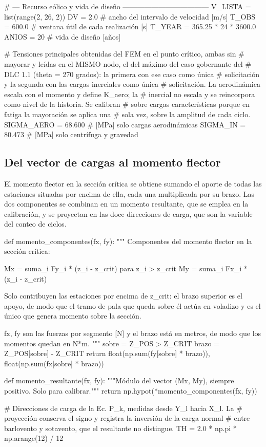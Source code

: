 \begin{pycode}
# --- Recurso eólico y vida de diseño ------------------------------------
V_LISTA   = list(range(2, 26, 2))
DV        = 2.0       # ancho del intervalo de velocidad [m/s]
T_OBS     = 600.0     # ventana útil de cada realización [s]
T_YEAR    = 365.25 * 24 * 3600.0
ANIOS     = 20        # vida de diseño [años]

# Tensiones principales obtenidas del FEM en el punto crítico, ambas sin
# mayorar y leídas en el MISMO nodo, el del máximo del caso gobernante del
# DLC 1.1 (theta = 270 grados): la primera con ese caso como única
# solicitación y la segunda con las cargas inerciales como única
# solicitación. La aerodinámica escala con el momento y define K_aero; la
# inercial no escala y se reincorpora como nivel de la historia. Se calibran
# sobre cargas características porque en fatiga la mayoración se aplica una
# sola vez, sobre la amplitud de cada ciclo.
SIGMA_AERO = 68.600   # [MPa] solo cargas aerodinámicas
SIGMA_IN   = 80.473   # [MPa] solo centrífuga y gravedad
\end{pycode}

\subsection*{Del vector de cargas al momento flector}

El momento flector en la sección crítica se obtiene sumando el aporte de todas las estaciones situadas por encima de ella, cada una multiplicada por su brazo. Las dos componentes se combinan en un momento resultante, que se emplea en la calibración, y se proyectan en las doce direcciones de carga, que son la variable del conteo de ciclos.

\begin{pycode}
def momento_componentes(fx, fy):
    """
    Componentes del momento flector en la sección crítica:

        Mx = suma_i Fy_i * (z_i - z_crit)      para z_i > z_crit
        My = suma_i Fx_i * (z_i - z_crit)

    Solo contribuyen las estaciones por encima de z_crit: el brazo
    superior es el apoyo, de modo que el tramo de pala que queda sobre él
    actúa en voladizo y es el único que genera momento sobre la sección.

    fx, fy son las fuerzas por segmento [N] y el brazo está en metros, de
    modo que los momentos quedan en N*m.
    """
    sobre = Z_POS > Z_CRIT
    brazo = Z_POS[sobre] - Z_CRIT
    return float(np.sum(fy[sobre] * brazo)), float(np.sum(fx[sobre] * brazo))


def momento_resultante(fx, fy):
    """Módulo del vector (Mx, My), siempre positivo. Solo para calibrar."""
    return np.hypot(*momento_componentes(fx, fy))


# Direcciones de carga de la Ec. P_k, medidas desde Y_l hacia X_l. La
# proyección conserva el signo y registra la inversión de la carga normal
# entre barlovento y sotavento, que el resultante no distingue.
TH = 2.0 * np.pi * np.arange(12) / 12
\end{pycode}

